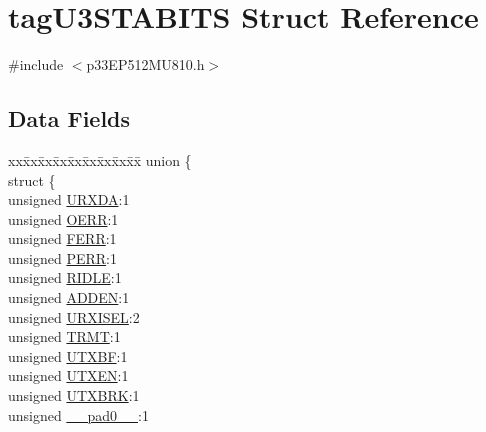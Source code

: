 \hypertarget{structtag_u3_s_t_a_b_i_t_s}{}\section{tag\+U3\+S\+T\+A\+B\+I\+TS Struct Reference}
\label{structtag_u3_s_t_a_b_i_t_s}


{\ttfamily \#include $<$p33\+E\+P512\+M\+U810.\+h$>$}

\subsection*{Data Fields}
\begin{DoxyCompactItemize}
\item 
\begin{tabbing}
xx\=xx\=xx\=xx\=xx\=xx\=xx\=xx\=xx\=\kill
union \{\\
\>struct \{\\
\>\>unsigned \hyperlink{structtag_u3_s_t_a_b_i_t_s_afe0995f70524f97d3bbf5a19da8be125}{URXDA}:1\\
\>\>unsigned \hyperlink{structtag_u3_s_t_a_b_i_t_s_a51850c0a0e36c88695788d8258825fb1}{OERR}:1\\
\>\>unsigned \hyperlink{structtag_u3_s_t_a_b_i_t_s_a6e9c49ea6356906ea25431c922eb7c71}{FERR}:1\\
\>\>unsigned \hyperlink{structtag_u3_s_t_a_b_i_t_s_a5223bc48d63e95d58e42b4cdd2edbf26}{PERR}:1\\
\>\>unsigned \hyperlink{structtag_u3_s_t_a_b_i_t_s_a8016ed1f9d9355d999bd0b5acfce06da}{RIDLE}:1\\
\>\>unsigned \hyperlink{structtag_u3_s_t_a_b_i_t_s_aa4d6c69beac6d542ad6bc014875fdff2}{ADDEN}:1\\
\>\>unsigned \hyperlink{structtag_u3_s_t_a_b_i_t_s_a8d6af72bfcd1f23f63ace4f6e89dfcdf}{URXISEL}:2\\
\>\>unsigned \hyperlink{structtag_u3_s_t_a_b_i_t_s_a63ff36fd0aa1645fb63d427eb941f177}{TRMT}:1\\
\>\>unsigned \hyperlink{structtag_u3_s_t_a_b_i_t_s_ae6f14589464b1e04ff7734553772427e}{UTXBF}:1\\
\>\>unsigned \hyperlink{structtag_u3_s_t_a_b_i_t_s_aa6ca11f821bfebd67e7001d212fbceea}{UTXEN}:1\\
\>\>unsigned \hyperlink{structtag_u3_s_t_a_b_i_t_s_a5e99a7959107d3aa21958bad8ee4bc6e}{UTXBRK}:1\\
\>\>unsigned \hyperlink{structtag_u3_s_t_a_b_i_t_s_adf71f3d8410c1f1dbbc96680a92c49af}{\_\_pad0\_\_}:1\\

\end{tabbing}
\end{DoxyCompactItemize}
